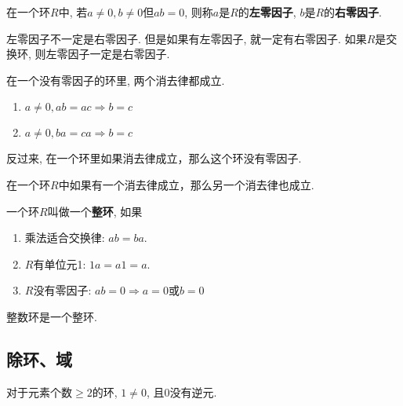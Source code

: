 \begin{Definition}[零因子]
在一个环$R$中, 若$a \neq \mathfrak{0}, b \neq \mathfrak{0}$但$ab = \mathfrak{0}$, 则称$a$是$R$的\textbf{左零因子}, $b$是$R$的\textbf{右零因子}.
\end{Definition}

\begin{Remark}
左零因子不一定是右零因子. 但是如果有左零因子, 就一定有右零因子. 如果$R$是交换环, 则左零因子一定是右零因子.
\end{Remark}

\begin{Theorem}
在一个没有零因子的环里, 两个消去律都成立.
\begin{enumerate}
	\item $a \neq \mathfrak{0}, ab = ac \Rightarrow b = c$
	\item $a \neq \mathfrak{0}, ba = ca \Rightarrow b = c$
\end{enumerate}
反过来, 在一个环里如果\;\;消去律成立，那么这个环没有零因子.
\end{Theorem}

\begin{Corollary}
在一个环$R$中如果有一个消去律成立，那么另一个消去律也成立.
\end{Corollary}

\begin{Definition}[整环]
一个环$R$叫做一个\textbf{整环}, 如果
\begin{enumerate}
	\item 乘法适合交换律: $ab = ba$.
	\item $R$有单位元1: $\mathfrak{1}a = a\mathfrak{1} = a$.
	\item $R$没有零因子: $ab = \mathfrak{0} \Rightarrow a = \mathfrak{0}$或$b = \mathfrak{0}$
\end{enumerate}
\end{Definition}

\begin{Proposition}
整数环是一个整环.
\end{Proposition}

\subsection{除环、域}

\begin{Proposition}
对于元素个数$\ge 2$的环, $\mathfrak{1} \neq \mathfrak{0}$, 且$\mathfrak{0}$没有逆元.
\end{Proposition}

